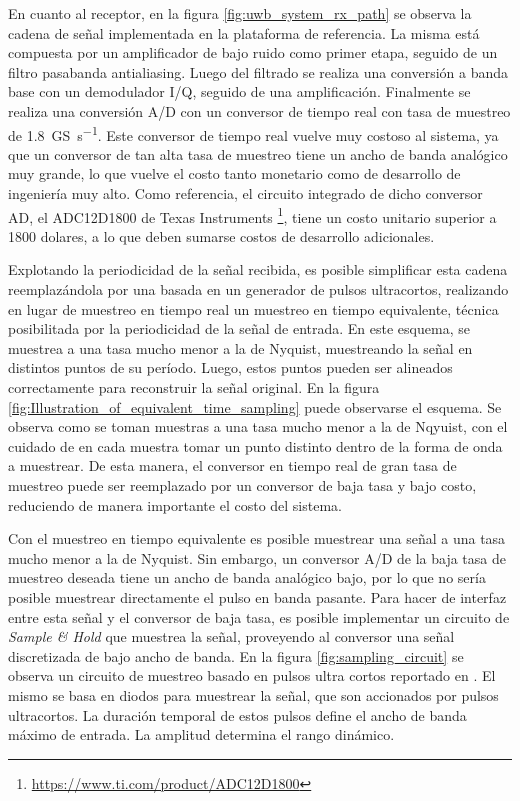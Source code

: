 En cuanto al receptor, en la figura \ref{fig:uwb_system_rx_path} se observa la
cadena de señal implementada en la plataforma de referencia. La misma está
compuesta por un amplificador de bajo ruido como primer etapa, seguido de un
filtro pasabanda antialiasing. Luego del filtrado se realiza una conversión a
banda base con un demodulador I/Q, seguido de una amplificación. Finalmente se
realiza una conversión A/D con un conversor de tiempo real con tasa de muestreo
de \qty[per-mode=symbol]{1.8}{\giga\siemens\per\second}. Este conversor de
tiempo real vuelve muy costoso al sistema, ya que un conversor de tan alta tasa
de muestreo tiene un ancho de banda analógico muy grande, lo que vuelve el costo
tanto monetario como de desarrollo de ingeniería muy alto.  Como referencia, el
circuito integrado de dicho conversor AD, el ADC12D1800 de Texas Instruments
\footnote{\url{https://www.ti.com/product/ADC12D1800}},
tiene un costo unitario superior a 1800 dolares, a lo que deben sumarse costos
de desarrollo adicionales.

Explotando la periodicidad de la señal recibida, es posible simplificar esta
cadena reemplazándola por una basada en un generador de pulsos ultracortos,
realizando en lugar de muestreo en tiempo real un muestreo en tiempo
equivalente, técnica posibilitada por la periodicidad de la señal de entrada. En
este esquema, se muestrea a una tasa mucho menor a la de Nyquist, muestreando la
señal en distintos puntos de su período. Luego, estos puntos pueden ser
alineados correctamente para reconstruir la señal original. En la figura
\ref{fig:Illustration_of_equivalent_time_sampling} puede observarse el esquema.
Se observa como se toman muestras a una tasa mucho menor a la de Nqyuist, con el
cuidado de en cada muestra tomar un punto distinto dentro de la forma de onda a
muestrear. De esta manera, el conversor en tiempo real de gran tasa de muestreo
puede ser reemplazado por un conversor de baja tasa y bajo costo, reduciendo de
manera importante el costo del sistema.

Con el muestreo en tiempo equivalente es posible muestrear una señal a una tasa
mucho menor a la de Nyquist. Sin embargo, un conversor A/D de la baja tasa de
muestreo deseada tiene un ancho de banda analógico bajo, por lo que no sería
posible muestrear directamente el pulso en banda pasante. Para hacer de interfaz
entre esta señal y el conversor de baja tasa, es posible implementar un circuito
de \textit{Sample \& Hold} que muestrea la señal, proveyendo al conversor una
señal discretizada de bajo ancho de banda. En la figura
\ref{fig:sampling_circuit} se observa un circuito de muestreo basado en pulsos
ultra cortos reportado en \cite{han2004}. El mismo se basa en diodos para
muestrear la señal, que son accionados por pulsos ultracortos. La duración
temporal de estos pulsos define el ancho de banda máximo de entrada. La amplitud
determina el rango dinámico.

